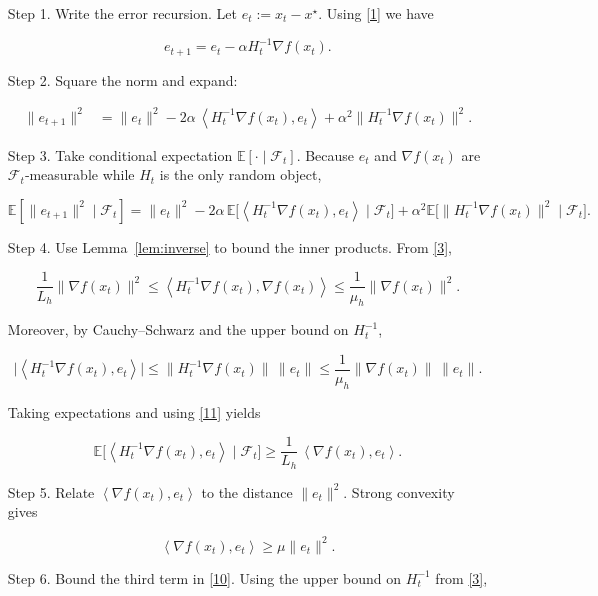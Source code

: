 \documentclass{article}
\newcommand{\E}{\mathbb{E}}
\newcommand{\ip}[2]{\left\langle #1,#2\right\rangle}
\begin{document}
\begin{enumerate}
\item[Step 1.]  Write the error recursion.  Let $e_t:=x_t-x^{\star}$.  Using \eqref{1} we have  

\[
e_{t+1}=e_t-\alpha H_t^{-1}\nabla f(x_t).
\tag{8}
\]

\item[Step 2.]  Square the norm and expand:  

\[
\begin{aligned}
\|e_{t+1}\|^{2}
&=\|e_t\|^{2}
-2\alpha\,\ip{H_t^{-1}\nabla f(x_t)}{e_t}
+\alpha^{2}\|H_t^{-1}\nabla f(x_t)\|^{2}.
\end{aligned}
\tag{9}
\]

\item[Step 3.]  Take conditional expectation $\E[\cdot\mid\mathcal{F}_t]$.  
Because $e_t$ and $\nabla f(x_t)$ are $\mathcal{F}_t$‑measurable while $H_t$ is the only random object,  

\[
\E[\|e_{t+1}\|^{2}\mid\mathcal{F}_t]
=\|e_t\|^{2}
-2\alpha\,\E\!\big[\ip{H_t^{-1}\nabla f(x_t)}{e_t}\mid\mathcal{F}_t\big]
+\alpha^{2}\E\!\big[\|H_t^{-1}\nabla f(x_t)\|^{2}\mid\mathcal{F}_t\big].
\tag{10}
\]

\item[Step 4.]  Use Lemma~\ref{lem:inverse} to bound the inner products.  
From \eqref{3},  

\[
\frac{1}{L_h}\|\nabla f(x_t)\|^{2}
\le
\ip{H_t^{-1}\nabla f(x_t)}{\nabla f(x_t)}
\le
\frac{1}{\mu_h}\|\nabla f(x_t)\|^{2}.
\tag{11}
\]

Moreover, by Cauchy–Schwarz and the upper bound on $H_t^{-1}$,

\[
\big|\ip{H_t^{-1}\nabla f(x_t)}{e_t}\big|
\le
\|H_t^{-1}\nabla f(x_t)\|\,\|e_t\|
\le
\frac{1}{\mu_h}\|\nabla f(x_t)\|\,\|e_t\|.
\tag{12}
\]

Taking expectations and using \eqref{11} yields  

\[
\E\!\big[\ip{H_t^{-1}\nabla f(x_t)}{e_t}\mid\mathcal{F}_t\big]
\ge
\frac{1}{L_h}\,\ip{\nabla f(x_t)}{e_t}.
\tag{13}
\]

\item[Step 5.]  Relate $\ip{\nabla f(x_t)}{e_t}$ to the distance $\|e_t\|^{2}$.  
Strong convexity gives  

\[
\ip{\nabla f(x_t)}{e_t}
\ge
\mu\|e_t\|^{2}.
\tag{14}
\]

\item[Step 6.]  Bound the third term in \eqref{10}.  Using the upper bound on $H_t^{-1}$ from \eqref{3},


\end{enumerate}
\end{document}
